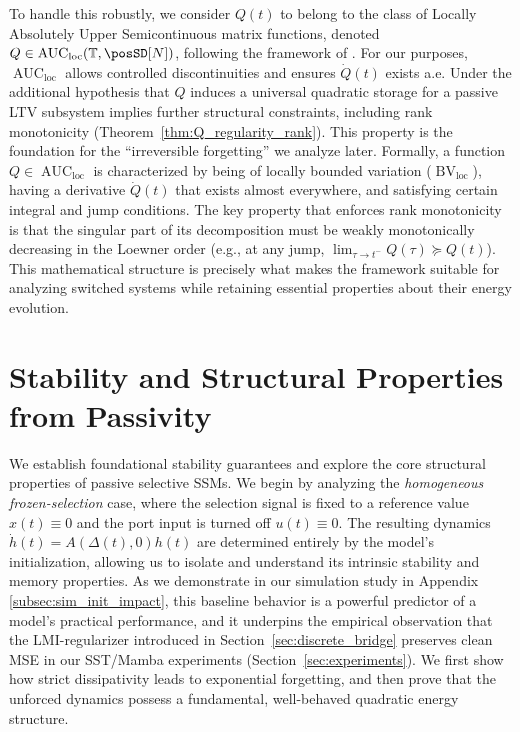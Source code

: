 \documentclass[10pt]{article} %
\newcommand{\timeInt}{\mathbb T}                        %
\newcommand{\loc}{\mathrm{loc}}                         %
\DeclareMathOperator{\BV}{BV}                           %
\DeclareMathOperator{\AUC}{AUC}                         %
\theoremstyle{definition}
\begin{document}
To handle this robustly, we consider $Q(t)$ to belong to the class of Locally Absolutely Upper Semicontinuous matrix functions, denoted $Q \in \AUC_\loc(\timeInt, \posSD[N])$, following the framework of \citep{MorandinHinsen2024}. For our purposes, $\AUC_{\loc}$ allows controlled discontinuities and ensures $\dot Q(t)$ exists a.e. Under the additional hypothesis that $Q$ induces a universal quadratic storage for a passive LTV subsystem implies further structural constraints, including rank monotonicity (Theorem~\ref{thm:Q_regularity_rank}). This property is the foundation for the ``irreversible forgetting'' we analyze later.
Formally, a function $Q \in \AUC_\loc$ is characterized by being of locally bounded variation ($\BV_{\loc}$), having a derivative $\dot{Q}(t)$ that exists almost everywhere, and satisfying certain integral and jump conditions. The key property that enforces rank monotonicity is that the singular part of its decomposition must be weakly monotonically decreasing in the Loewner order (e.g., at any jump, $\lim_{\tau \to t^-} Q(\tau) \succeq Q(t)$). This mathematical structure is precisely what makes the framework suitable for analyzing switched systems while retaining essential properties about their energy evolution.

\section{Stability and Structural Properties from Passivity}
\label{sec:fundamental_properties}
We establish foundational stability guarantees and explore the core structural properties of passive selective SSMs. We begin by analyzing the \emph{homogeneous frozen-selection} case, where the selection signal is fixed to a reference value $x(t)\equiv 0$ and the port input is turned off $u(t)\equiv 0$. The resulting dynamics $\dot{h}(t)=A(\Delta(t),0)h(t)$ are determined entirely by the model's initialization, allowing us to isolate and understand its intrinsic stability and memory properties. As we demonstrate in our simulation study in Appendix \ref{subsec:sim_init_impact}, this baseline behavior is a powerful predictor of a model's practical performance, and it underpins the empirical observation that the LMI-regularizer introduced in Section~\ref{sec:discrete_bridge} preserves clean MSE in our SST/Mamba experiments (Section~\ref{sec:experiments}). We first show how strict dissipativity leads to exponential forgetting, and then prove that the unforced dynamics possess a fundamental, well-behaved quadratic energy structure.
\end{document}
